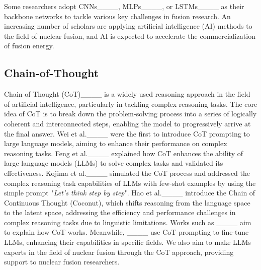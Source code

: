 Some researchers adopt CNNs____, MLPs____, or LSTMs____ as their backbone networks to tackle various key challenges in fusion research. 
An increasing number of scholars are applying artificial intelligence (AI) methods to the field of nuclear fusion, and AI is expected to accelerate the commercialization of fusion energy.



\subsection{Chain-of-Thought}
Chain of Thought (CoT)____ is a widely used reasoning approach in the field of artificial intelligence, particularly in tackling complex reasoning tasks. The core idea of CoT is to break down the problem-solving process into a series of logically coherent and interconnected steps, enabling the model to progressively arrive at the final answer. 
Wei et al.____ were the first to introduce CoT prompting to large language models, aiming to enhance their performance on complex reasoning tasks. 
Feng et al.____ explained how CoT enhances the ability of large language models (LLMs) to solve complex tasks and validated its effectiveness. 
Kojima et al.____ simulated the CoT process and addressed the complex reasoning task capabilities of LLMs with few-shot examples by using the simple prompt "\textit{Let's think step by step}".  
Hao et al.____ introduce the Chain of Continuous Thought (Coconut), which shifts reasoning from the language space to the latent space, addressing the efficiency and performance challenges in complex reasoning tasks due to linguistic limitations. 
Works such as ____ aim to explain how CoT works. Meanwhile, ____ use CoT prompting to fine-tune LLMs, enhancing their capabilities in specific fields. 
We also aim to make LLMs experts in the field of nuclear fusion through the CoT approach, providing support to nuclear fusion researchers.